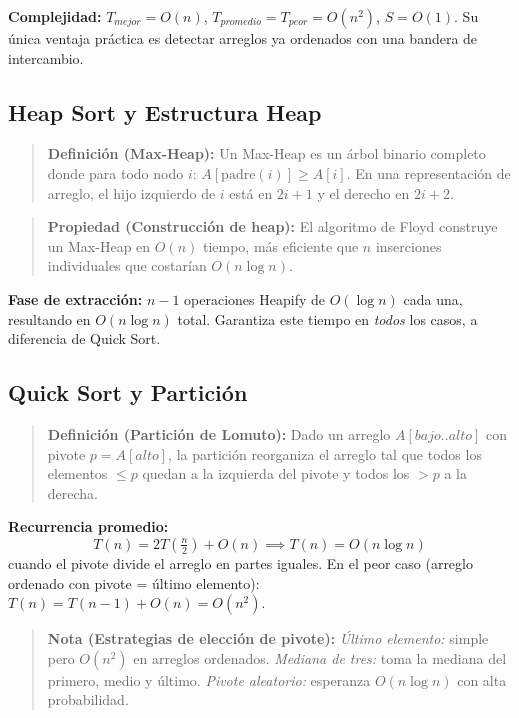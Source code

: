 \documentclass[12pt, letterpaper]{article}
\begin{document}
	\textbf{Complejidad:} $T_{mejor} = O(n)$, $T_{promedio} = T_{peor} = O(n^2)$, $S = O(1)$. Su única ventaja práctica es detectar arreglos ya ordenados con una bandera de intercambio.
	
	\subsection{Heap Sort y Estructura Heap}
	
	\begin{quote}
		\textbf{Definición (Max-Heap):}
		Un Max-Heap es un árbol binario completo donde para todo nodo $i$: $A[\text{padre}(i)] \geq A[i]$. En una representación de arreglo, el hijo izquierdo de $i$ está en $2i+1$ y el derecho en $2i+2$.
	\end{quote}
	
	\begin{quote}
		\textbf{Propiedad (Construcción de heap):}
		El algoritmo de Floyd construye un Max-Heap en $O(n)$ tiempo, más eficiente que $n$ inserciones individuales que costarían $O(n \log n)$.
	\end{quote}
	
	\textbf{Fase de extracción:} $n-1$ operaciones Heapify de $O(\log n)$ cada una, resultando en $O(n \log n)$ total. Garantiza este tiempo en \textit{todos} los casos, a diferencia de Quick Sort.
	
	\subsection{Quick Sort y Partición}
	
	\begin{quote}
		\textbf{Definición (Partición de Lomuto):}
		Dado un arreglo $A[bajo..alto]$ con pivote $p = A[alto]$, la partición reorganiza el arreglo tal que todos los elementos $\leq p$ quedan a la izquierda del pivote y todos los $> p$ a la derecha.
	\end{quote}
	
	\textbf{Recurrencia promedio:}
	\[
	T(n) = 2T\!\left(\tfrac{n}{2}\right) + O(n) \implies T(n) = O(n \log n)
	\]
	cuando el pivote divide el arreglo en partes iguales. En el peor caso (arreglo ordenado con pivote = último elemento): $T(n) = T(n-1) + O(n) = O(n^2)$.
	
	\begin{quote}
		\textbf{Nota (Estrategias de elección de pivote):}
		\textit{Último elemento:} simple pero $O(n^2)$ en arreglos ordenados. \textit{Mediana de tres:} toma la mediana del primero, medio y último. \textit{Pivote aleatorio:} esperanza $O(n \log n)$ con alta probabilidad.
	\end{quote}
	
\end{document}
